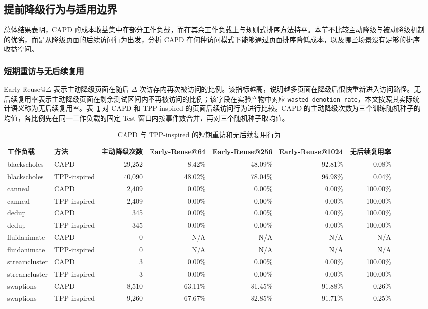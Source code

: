 \subsection{\heiti 提前降级行为与适用边界}

总体结果表明，CAPD 的成本收益集中在部分工作负载，而在其余工作负载上与规则式排序方法持平。本节不比较主动降级与被动降级机制的优劣，而是从降级页面的后续访问行为出发，分析 CAPD 在何种访问模式下能够通过页面排序降低成本，以及哪些场景没有足够的排序收益空间。

\subsubsection{\heiti 短期重访与无后续复用}

Early-Reuse@$\Delta$ 表示主动降级页面在随后 $\Delta$ 次访存内再次被访问的比例。该指标越高，说明越多页面在降级后很快重新进入访问路径。无后续复用率表示主动降级页面在剩余测试区间内不再被访问的比例；该字段在实验产物中对应 \texttt{wasted\_demotion\_rate}，本文按照其实际统计语义称为无后续复用率。表~\ref{tab:capd-early-reuse} 对 CAPD 和 TPP-inspired 的页面后续访问行为进行比较。CAPD 的主动降级次数为三个训练随机种子的均值，各比例先在同一工作负载的固定 Test 窗口内按事件数合并，再对三个随机种子取均值。

\begin{table}[htbp]
  \centering
  \scriptsize
  \caption{CAPD 与 TPP-inspired 的短期重访和无后续复用行为}
  \label{tab:capd-early-reuse}
  \renewcommand{\arraystretch}{1.12}
  \setlength{\tabcolsep}{4pt}
  \begin{tabular}{llrrrrr}
    \toprule
    工作负载 & 方法 & 主动降级次数 & Early-Reuse@64 & Early-Reuse@256 & Early-Reuse@1024 & 无后续复用率 \\
    \midrule
    blackscholes  & CAPD         & 29,252 & 8.42\%  & 48.09\% & 92.81\% & 0.08\% \\
    blackscholes  & TPP-inspired & 40,090 & 48.02\% & 78.04\% & 96.98\% & 0.04\% \\
    canneal       & CAPD         & 2,409 & 0.00\% & 0.00\% & 0.00\% & 100.00\% \\
    canneal       & TPP-inspired & 2,409 & 0.00\% & 0.00\% & 0.00\% & 100.00\% \\
    dedup         & CAPD         & 345 & 0.00\% & 0.00\% & 0.00\% & 100.00\% \\
    dedup         & TPP-inspired & 345 & 0.00\% & 0.00\% & 0.00\% & 100.00\% \\
    fluidanimate  & CAPD         & 0 & N/A & N/A & N/A & N/A \\
    fluidanimate  & TPP-inspired & 0 & N/A & N/A & N/A & N/A \\
    streamcluster & CAPD         & 3 & 0.00\% & 0.00\% & 0.00\% & 100.00\% \\
    streamcluster & TPP-inspired & 3 & 0.00\% & 0.00\% & 0.00\% & 100.00\% \\
    swaptions     & CAPD         & 8,510 & 63.11\% & 81.45\% & 91.88\% & 0.26\% \\
    swaptions     & TPP-inspired & 9,260 & 67.67\% & 82.85\% & 91.71\% & 0.25\% \\
    \bottomrule
  \end{tabular}
\end{table}

